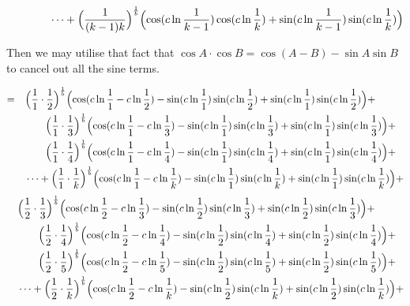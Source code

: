 \documentclass{amsart}
\begin{document}
	\[ \qquad\qquad \dots + \Bigl( \frac{1}{(k-1)k} \Bigr)^\frac1b \Bigl( \cos(c \ln \frac{1}{k-1}) \cos(c \ln \frac{1}{k}) + \sin(c \ln \frac{1}{k-1}) \sin(c \ln \frac{1}{k}) \Bigr) \]
	
	Then we may utilise that fact that $ \cos{A} \cdot \cos{B} = \cos{(A-B)} - \sin{A}\sin{B} $ to cancel out all the sine terms.
	
	\[
	\begin{aligned}
		= \quad & \Bigl( \frac{1}{1} \cdot \frac{1}{2} \Bigr)^\frac1b \Bigl( \cos(c \ln \frac{1}{1} - c \ln \frac{1}{2}) - \sin(c \ln \frac{1}{1}) \sin(c \ln \frac{1}{2}) + \sin(c \ln \frac{1}{1}) \sin(c \ln \frac{1}{2}) \Bigr) + \\
		& \qquad \Bigl( \frac{1}{1} \cdot \frac{1}{3} \Bigr)^\frac1b \Bigl( \cos(c \ln \frac{1}{1} - c \ln \frac{1}{3}) - \sin(c \ln \frac{1}{1}) \sin(c \ln \frac{1}{3}) + \sin(c \ln \frac{1}{1}) \sin(c \ln \frac{1}{3}) \Bigr) + \\
		& \qquad \Bigl( \frac{1}{1} \cdot \frac{1}{4} \Bigr)^\frac1b \Bigl( \cos(c \ln \frac{1}{1} - c \ln \frac{1}{4}) - \sin(c \ln \frac{1}{1}) \sin(c \ln \frac{1}{4}) + \sin(c \ln \frac{1}{1}) \sin(c \ln \frac{1}{4}) \Bigr) + \\
		& \dots  + \Bigl( \frac{1}{1} \cdot \frac{1}{k} \Bigr)^\frac1b \Bigl( \cos(c \ln \frac{1}{1} - c \ln \frac{1}{k}) - \sin(c \ln \frac{1}{1}) \sin(c \ln \frac{1}{k}) + \sin(c \ln \frac{1}{1}) \sin(c \ln \frac{1}{k}) \Bigr) + 
	\end{aligned}
	\]
	\[
	\begin{aligned}
		\quad & \Bigl( \frac{1}{2} \cdot \frac{1}{3} \Bigr)^\frac1b \Bigl( \cos(c \ln \frac{1}{2} - c \ln \frac{1}{3}) - \sin(c \ln \frac{1}{2}) \sin(c \ln \frac{1}{3}) + \sin(c \ln \frac{1}{2}) \sin(c \ln \frac{1}{3}) \Bigr) + \\
		& \qquad \Bigl( \frac{1}{2} \cdot \frac{1}{4} \Bigr)^\frac1b \Bigl( \cos(c \ln \frac{1}{2} - c \ln \frac{1}{4}) - \sin(c \ln \frac{1}{2}) \sin(c \ln \frac{1}{4}) + \sin(c \ln \frac{1}{2}) \sin(c \ln \frac{1}{4}) \Bigr) + \\
		& \qquad \Bigl( \frac{1}{2} \cdot \frac{1}{5} \Bigr)^\frac1b \Bigl( \cos(c \ln \frac{1}{2} - c \ln \frac{1}{5}) - \sin(c \ln \frac{1}{2}) \sin(c \ln \frac{1}{5}) + \sin(c \ln \frac{1}{2}) \sin(c \ln \frac{1}{5}) \Bigr) + \\
		& \dots  + \Bigl( \frac{1}{2} \cdot \frac{1}{k} \Bigr)^\frac1b \Bigl( \cos(c \ln \frac{1}{2} - c \ln \frac{1}{k}) - \sin(c \ln \frac{1}{2}) \sin(c \ln \frac{1}{k}) + \sin(c \ln \frac{1}{2}) \sin(c \ln \frac{1}{k}) \Bigr) + 
	\end{aligned}
	\]
\end{document}
